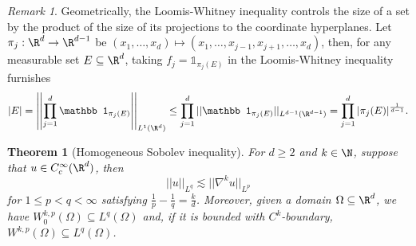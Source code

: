 \documentclass[reqno]{amsart}
\newtheorem{theorem}{Theorem}
\theoremstyle{definition}
\theoremstyle{remark}
\newtheorem*{remark}{Remark}
\begin{document}
\begin{remark}
	Geometrically, the Loomis-Whitney inequality controls the size of a set by the product of the size of its projections to the coordinate hyperplanes. Let $\pi_j : \R^d \to \R^{d - 1}$ be $(x_1, \dots, x_d) \mapsto (x_1, \dots, x_{j - 1}, x_{j + 1}, \dots, x_d)$, then, for any measurable set $E \subseteq \R^d$, taking $f_j = \mathbb 1_{\pi_j (E)}$ in the Loomis-Whitney inequality furnishes
		\[ |E| = \left| \left| \prod_{j = 1}^d \mathbb 1_{\pi_j (E)} \right| \right|_{L^1 (\R^d)}  \leq \prod_{j = 1}^d ||\mathbb 1_{\pi_j (E)} ||_{L^{d - 1} (\R^{d - 1})} = \prod_{j = 1}^d |\pi_j (E)|^{\frac{1}{d - 1}}. \]
\end{remark}

\begin{theorem}[Homogeneous Sobolev inequality]
	For $d \geq 2$ and $k \in \N$, suppose that $u \in C^\infty_c (\R^d)$, then 
		\[ ||u||_{L^q} \lesssim ||\nabla^k u||_{L^p} \]
	for $1 \leq p < q < \infty$ satisfying $\tfrac{1}{p} - \tfrac{1}{q}	= \tfrac{k}{d}$. Moreover, given a domain $\Omega \subseteq \R^d$, we have $W^{k, p}_0 (\Omega) \subseteq L^q (\Omega)$ and, if it is bounded with $C^k$-boundary, $W^{k, p} (\Omega) \subseteq L^q (\Omega)$. 
\end{theorem}
\end{document}
